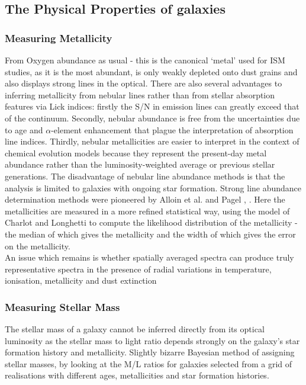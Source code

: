 \documentclass{literature}
\begin{document}
\subsection{The Physical Properties of galaxies}
\subsubsection{Measuring Metallicity}
From Oxygen abundance as usual - this is the canonical `metal' used for ISM studies, as it is the most abundant, is only weakly depleted onto dust grains and also displays strong lines in the optical. There are also several advantages to inferring metallicity from nebular lines rather than from stellar absorption features via Lick indices: firstly the S/N in emission lines can greatly exceed that of the continuum. Secondly, nebular abundance is free from the uncertainties due to age and $\alpha$-element enhancement that plague the interpretation of absorption line indices. Thirdly, nebular metallicities are easier to interpret in the context of chemical evolution models because they represent the present-day metal abundance rather than the luminosity-weighted average or previous stellar generations. The disadvantage of nebular line abundance methods is that the analysis is limited to galaxies with ongoing star formation. Strong line abundance determination methods were pioneered by Alloin et al. and Pagel \citep{Alloin_1979}, \citep{Pagel_1979}. Here the metallicities are measured in a more refined statistical way, using the model of Charlot and Longhetti \citep{Charlot_2001} to compute the likelihood distribution of the metallicity - the median of which gives the metallicity and the width of which gives the error on the metallicity. \\ 
An issue which remains is whether spatially averaged spectra can produce truly representative spectra in the presence of radial variations in temperature, ionisation, metallicity and dust extinction \citep{Kobulnicky_1999} 
\subsubsection{Measuring Stellar Mass}
The stellar mass of a galaxy cannot be inferred directly from its optical luminosity as the stellar mass to light ratio depends strongly on the galaxy's star formation history and metallicity. Slightly bizarre Bayesian method of assigning stellar masses, by looking at the M/L ratios for galaxies selected from a grid of realisations with different ages, metallicities and star formation histories. \\ 
\end{document}
